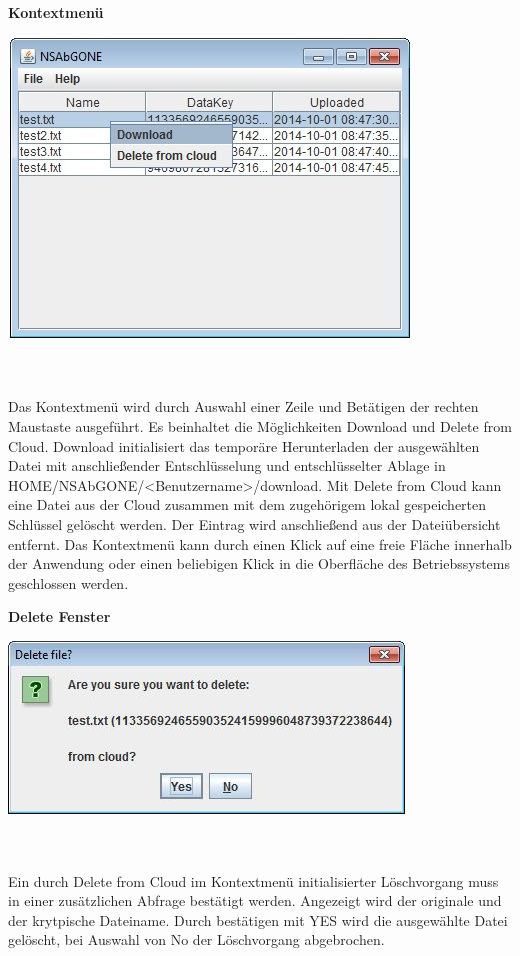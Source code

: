 \documentclass[12pt,a4paper,bibliography=totocnumbered,listof=totocnumbered]{scrartcl}
\begin{document}
\textbf{Kontextmenü}
\vspace{1em}
$\;$\\
\begin{minipage}{\linewidth}
	\centering
	\includegraphics[width=0.4\linewidth]{Kontext.jpg}
	\label{Kontext}
\end{minipage}
\\\\Das Kontextmenü wird durch Auswahl einer Zeile und Betätigen der rechten Maustaste ausgeführt. Es beinhaltet die Möglichkeiten Download und Delete from Cloud. Download initialisiert das temporäre Herunterladen der ausgewählten Datei mit anschließender Entschlüsselung und entschlüsselter Ablage in HOME/NSAbGONE/\textless Benutzername\textgreater/download. Mit Delete from Cloud kann eine Datei aus der Cloud zusammen mit dem zugehörigem lokal gespeicherten Schlüssel gelöscht werden. Der Eintrag wird anschließend aus der Dateiübersicht entfernt. Das Kontextmenü kann durch einen Klick auf eine freie Fläche innerhalb der Anwendung oder einen beliebigen Klick in die Oberfläche des Betriebssystems geschlossen werden.

\textbf{Delete Fenster}
\vspace{1em}
$\;$\\
\begin{minipage}{\linewidth}
	\centering
	\includegraphics[width=0.4\linewidth]{Delete.jpg}
	\label{Delete}
\end{minipage}
\\\\Ein durch Delete from Cloud im Kontextmenü initialisierter Löschvorgang muss in einer zusätzlichen Abfrage bestätigt werden. Angezeigt wird der originale und der krytpische Dateiname. Durch bestätigen mit YES wird die ausgewählte Datei gelöscht, bei Auswahl von No der Löschvorgang abgebrochen.
\end{document}
